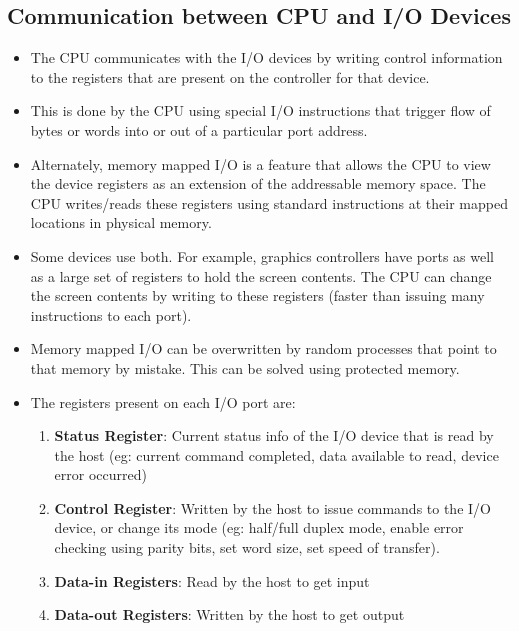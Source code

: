 \documentclass{article}
\theoremstyle{plain}
\theoremstyle{definition}
\begin{document}
\subsection{Communication between CPU and I/O Devices}
\begin{itemize}
    \item The CPU communicates with the I/O devices by writing control information to the registers that are present on the controller for that device. 
    
    \item This is done by the CPU using special I/O instructions that trigger flow of bytes or words into or out of a particular port address. 
    
    \item Alternately, memory mapped I/O is a feature that allows the CPU to view the device registers as an extension of the addressable memory space. The CPU writes/reads these registers using standard instructions at their mapped locations in physical memory. 
    
    \item Some devices use both. For example, graphics controllers have ports as well as a large set of registers to hold the screen contents. The CPU can change the screen contents by writing to these registers (faster than issuing many instructions to each port). 
    
    \item Memory mapped I/O can be overwritten by random processes that point to that memory by mistake. This can be solved using protected memory.
    
    \item The registers present on each I/O port are:
    \begin{enumerate}
        \item \textbf{Status Register}: Current status info of the I/O device that is read by the host (eg: current command completed, data available to read, device error occurred)
        
        \item \textbf{Control Register}: Written by the host to issue commands to the I/O device, or change its mode (eg: half/full duplex mode, enable error checking using parity bits, set word size, set speed of transfer).
        
        \item \textbf{Data-in Registers}: Read by the host to get input
        
        \item \textbf{Data-out Registers}: Written by the host to get output
    \end{enumerate}
\end{itemize}
\end{document}
